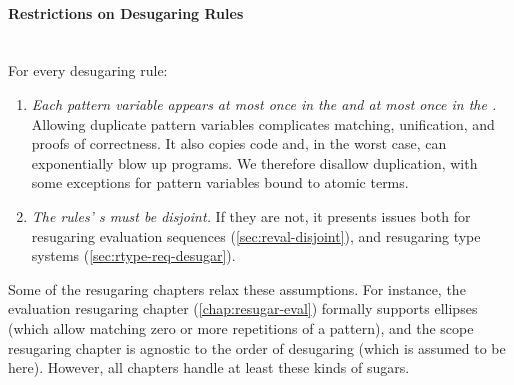 \paragraph{Restrictions on Desugaring Rules}\\ \noindent
For every desugaring rule:
\begin{enumerate}
\item \emph{Each pattern variable appears at most once in the  and at
  most once in the .}
  Allowing duplicate pattern variables complicates matching, unification,
  and proofs of correctness. It also copies code
  and, in the worst case, can exponentially blow up programs.
  We therefore disallow duplication,
  with some exceptions for pattern variables bound to atomic terms.
\item \emph{The rules' s must be disjoint.} If they
  are not, it presents issues both for resugaring evaluation sequences
  (\cref{sec:reval-disjoint}), and resugaring type systems
  (\cref{sec:rtype-req-desugar}).
\end{enumerate}

Some of the resugaring chapters relax these assumptions. For instance, the
evaluation resugaring chapter (\cref{chap:resugar-eval}) formally
supports ellipses (which allow matching zero or more repetitions of a
pattern), and the scope resugaring chapter is agnostic to the order of
desugaring (which is assumed to be  here). However, all
chapters handle at least these kinds of sugars.
